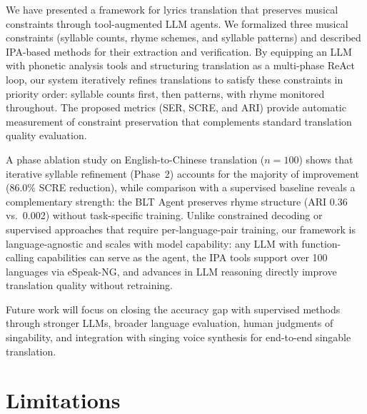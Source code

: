 \documentclass[11pt]{article}
\begin{document}
We have presented a framework for lyrics translation that preserves musical constraints through tool-augmented LLM agents.
We formalized three musical constraints (syllable counts, rhyme schemes, and syllable patterns) and described IPA-based methods for their extraction and verification.
By equipping an LLM with phonetic analysis tools and structuring translation as a multi-phase ReAct loop, our system iteratively refines translations to satisfy these constraints in priority order: syllable counts first, then patterns, with rhyme monitored throughout.
The proposed metrics (SER, SCRE, and ARI) provide automatic measurement of constraint preservation that complements standard translation quality evaluation.

A phase ablation study on English-to-Chinese translation ($n{=}100$) shows that iterative syllable refinement (Phase~2) accounts for the majority of improvement (86.0\% SCRE reduction), while comparison with a supervised baseline \citep{ou-etal-2023-songs} reveals a complementary strength: the BLT Agent preserves rhyme structure (ARI 0.36 vs.\ 0.002) without task-specific training.
Unlike constrained decoding \citep{hokamp-liu-2017-lexically,post-vilar-2018-fast} or supervised approaches that require per-language-pair training, our framework is language-agnostic and scales with model capability: any LLM with function-calling capabilities can serve as the agent, the IPA tools support over 100 languages via eSpeak-NG, and advances in LLM reasoning directly improve translation quality without retraining.

Future work will focus on closing the accuracy gap with supervised methods through stronger LLMs, broader language evaluation, human judgments of singability, and integration with singing voice synthesis \citep{ren-etal-2020-deepsinger} for end-to-end singable translation.

\section*{Limitations}
\end{document}
